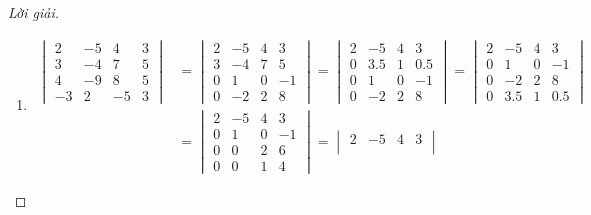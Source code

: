 \documentclass[class=linearalgebra,crop=false]{standalone}
\begin{document}
\begin{proof}[Lời giải]
    \begin{enumerate}[label = (\alph*)]
        \item
            \begin{align*}
                \begin{vmatrix}
                    2  & -5 & 4  & 3 \\
                    3  & -4 & 7  & 5 \\
                    4  & -9 & 8  & 5 \\
                    -3 &  2 & -5 & 3
                \end{vmatrix}
                & =
                \begin{vmatrix}
                    2 & -5 & 4 & 3  \\
                    3 & -4 & 7 & 5  \\
                    0 & 1  & 0 & -1 \\
                    0 & -2 & 2 & 8
                \end{vmatrix}
                =
                \begin{vmatrix}
                    2 & -5  & 4 & 3   \\
                    0 & 3.5 & 1 & 0.5 \\
                    0 & 1   & 0 & -1  \\
                    0 & -2  & 2 & 8
                \end{vmatrix}
                =
                \begin{vmatrix}
                    2 & -5  & 4 & 3  \\
                    0 & 1   & 0 & -1 \\
                    0 & -2  & 2 & 8  \\
                    0 & 3.5 & 1 & 0.5
                \end{vmatrix} \\
                & =
                \begin{vmatrix}
                    2 & -5 & 4 & 3  \\
                    0 & 1  & 0 & -1 \\
                    0 & 0  & 2 & 6  \\
                    0 & 0  & 1 & 4
                \end{vmatrix}
                =
                \begin{vmatrix}
                    2 & -5 & 4 & 3  \\

\end{vmatrix}
\end{align*}
\end{enumerate}
\end{proof}
\end{document}
